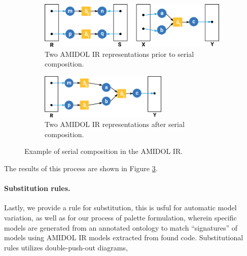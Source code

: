 \documentclass[12pt]{galois-whitepaper}
\begin{document}
    \centerline{
  }

  \begin{figure}
    \centering
    \begin{subfigure}[b]{0.45\textwidth}
      \includegraphics[width=\textwidth]{series-1.png}
      \caption{Two AMIDOL IR representations prior to serial composition.}
      \label{Fig:Parallel-1}
    \end{subfigure}
    \begin{subfigure}[b]{0.45\textwidth}
      \centering
      \includegraphics[width=0.67\textwidth]{series-2.png}
      \caption{Two AMIDOL IR representations after serial composition.}
      \label{Fig:Parallel-2}
    \end{subfigure}
    \caption{Example of serial composition in the AMIDOL IR.}
    \label{Fig:Serial}
  \end{figure}

The results of this process are shown in Figure \ref{Fig:Serial}.
  
  \paragraph{Substitution rules.} Lastly, we provide a rule for
  substitution, this is usful for automatic model variation, as well
  as for our process of palette formulation, wherein specific models
  are generated from an annotated ontology to match ``signatures'' of
  models using AMIDOL IR models extracted from found code.
  Substitutional rules utilizes double-push-out diagrams,
\end{document}
